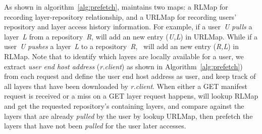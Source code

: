 
As shown in algorithm~\ref{alg:prefetch}, \sysname maintains two maps: a RLMap for recording layer-repository
relationship, and 
a URLMap for recording 
users' repository and layer access history information. 
For example, if a user~\emph{U} \emph{pulls} a layer~\emph{L} from a repository~\emph{R},
\sysname will add an new entry (\emph{U,L}) in URLMap.
While if a user~\emph{U} \emph{pushes} a  layer~\emph{L} to a repository~\emph{R},
\sysname~will add an new entry (\emph{R,L}) in RLMap. 
Note that to identify which layers are locally available for a user, 
we extract \emph{user end host address} (\emph{r.client}) as shown in Algorithm~\ref{alg:prefetch}) from each request and define the user end host address as user,
and keep track of all layers that have been downloaded by \emph{r.client}. 
When either a GET manifest request is received or 
a miss on a GET layer request happens,
\sysname will lookup RLMap and get the requested repository's containing layers,
and compare against the layers that are already \emph{pulled} by the user by lookup URLMap,
then prefetch the layers that have not been \emph{pulled} for the user later accesses.

 

